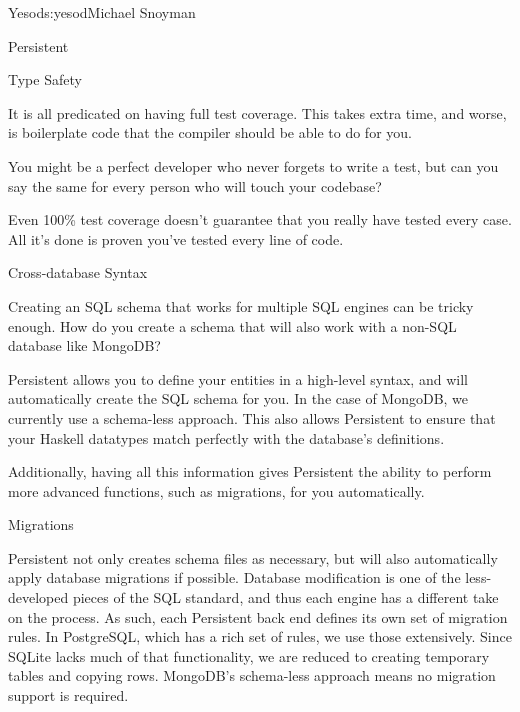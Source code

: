 \begin{aosachapter}{Yesod}{s:yesod}{Michael Snoyman}
\begin{aosasect1}{Persistent}
\begin{aosasect2}{Type Safety}
\begin{aosaitemize}

\item It is all predicated on having full test coverage. This takes
  extra time, and worse, is boilerplate code that the compiler should
  be able to do for you.

\item You might be a perfect developer who never forgets to write a
  test, but can you say the same for every person who will touch your
  codebase?

\item Even 100\% test coverage doesn't guarantee that you really have
  tested every case. All it's done is proven you've tested every line
  of code.

\end{aosaitemize}

\end{aosasect2}

\begin{aosasect2}{Cross-database Syntax}

Creating an SQL schema that works for multiple SQL engines can be
tricky enough. How do you create a schema that will also work with a
non-SQL database like MongoDB?

Persistent allows you to define your entities in a high-level syntax,
and will automatically create the SQL schema for you. In the case of
MongoDB, we currently use a schema-less approach. This also allows
Persistent to ensure that your Haskell datatypes match perfectly with
the database's definitions.

Additionally, having all this information gives Persistent the ability
to perform more advanced functions, such as migrations, for you automatically.

\end{aosasect2}

\begin{aosasect2}{Migrations}

Persistent not only creates schema files as necessary, but will also
automatically apply database migrations if possible. Database
modification is one of the less-developed pieces of the SQL standard,
and thus each engine has a different take on the process. As such,
each Persistent back end defines its own set of migration rules. In
PostgreSQL, which has a rich set of  rules, we use
those extensively. Since SQLite lacks much of that functionality, we
are reduced to creating temporary tables and copying rows. MongoDB's
schema-less approach means no migration support is required.


\end{aosasect2}
\end{aosasect1}
\end{aosachapter}
